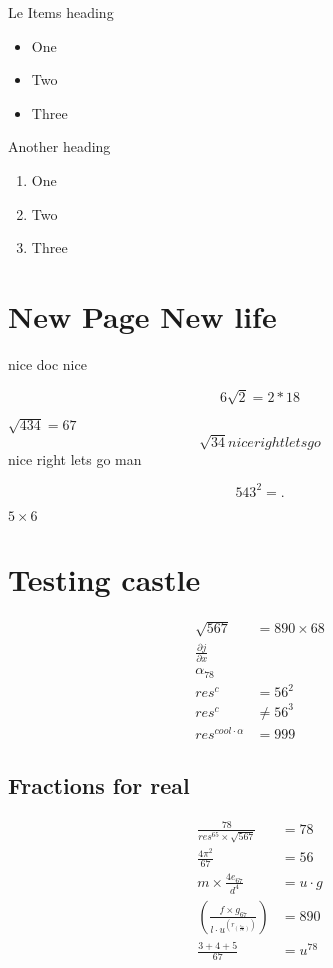 \documentclass[a4paper]{article}
\begin{document}
Le Items heading
\begin{itemize}
	\item One
	\item Two
	\item Three
\end{itemize}

Another heading
\begin{enumerate}
	\item One
	\item Two
	\item Three
\end{enumerate}

\newpage
\section{New Page New life}
nice doc nice

\[
	6\sqrt{2} = 2 * 18
\]

$\sqrt{434} = 67 $
\[
	\sqrt{34} nice right lets go
\]
nice right lets go man

\[
	543^2 =
	.\]

$5 \times 6$

\section{Testing castle}
\begin{align*}
	\sqrt{567}              & = 890 \times 68 \\
	\frac{\partial j}{\partial x}             \\
	\alpha_{78}                               \\
	res^{c}                 & = 56^2          \\
	res^{c}                 & \neq 56^3       \\
	res^{cool \cdot \alpha} & = 999
\end{align*}


\subsection{Fractions for real}

\begin{align*}
	\frac{78}{res^{65} \times \sqrt{567} } & = 78        \\
	\frac{4\pi^2}{67}                      & = 56        \\
	m \times \frac{4e_{67}}{d^{4}}         & = u \cdot g \\
	\left(
	\frac{f \times g_{67}}{l \cdot u^{
			\left(  r_{\left(\frac{e_{67}}{78}\right)}
			\right)}}
	\right)                                & = 890       \\
	\frac{3 + 4 + 5}{67}                   & = u^{78}    \\
\end{align*}
\end{document}
